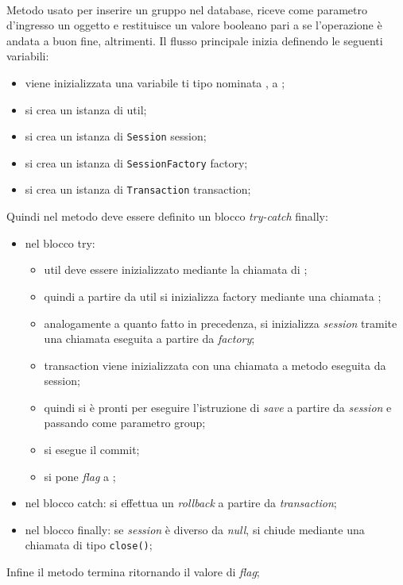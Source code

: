 \begin{description}
	\item{}\\
	Metodo usato per inserire un gruppo nel database, riceve come parametro d'ingresso un oggetto  e restituisce un valore booleano  pari a  se l'operazione è andata a buon fine,  altrimenti. Il flusso principale inizia definendo le seguenti variabili:
	\begin{itemize}
		\item viene inizializzata una variabile ti tipo  nominata , a ;
		\item si crea un istanza di  util;
		\item si crea un istanza di \texttt{Session} session;
		\item si crea un istanza di \texttt{SessionFactory} factory;
		\item si crea un istanza di \texttt{Transaction} transaction;
	\end{itemize}
	Quindi nel metodo deve essere definito un blocco \textit{try-catch} finally:
	\begin{itemize}
		\item nel blocco try:
		\begin{itemize}
			\item util deve essere inizializzato mediante la chiamata  di ;
			\item quindi a partire da util si inizializza factory mediante una chiamata ;
			\item analogamente a quanto fatto in precedenza, si inizializza \textit{session} tramite una chiamata  eseguita a partire da \textit{factory};
			\item transaction viene inizializzata con una chiamata a metodo  eseguita da session;
			\item quindi si è pronti per eseguire l'istruzione di \textit{save} a partire da \textit{session} e passando come parametro group;
			\item si esegue il commit;
			\item si pone \textit{flag} a ;
		\end{itemize}
		\item nel blocco catch: si effettua un \textit{rollback} a partire da \textit{transaction};
		\item nel blocco finally: se \textit{session} è diverso da \textit{null}, si chiude mediante una chiamata di tipo \texttt{close()};
	\end{itemize}
	Infine il metodo termina ritornando il valore di \textit{flag};
	

\end{description}
